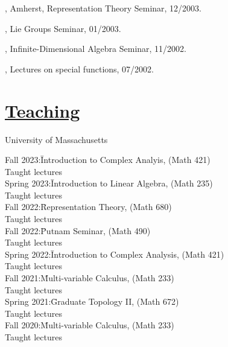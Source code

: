 \documentclass[11pt]{amsart}
\theoremstyle{plain}
\theoremstyle{definition}
\theoremstyle{remark}
\begin{document}
, Amherst,
Representation Theory
          Seminar, 12/2003.

, Lie Groups Seminar, 01/2003.



, Infinite-Dimensional Algebra Seminar,
11/2002.

, Lectures on special
functions, 07/2002.

\medskip


\section*{ {\Large\underline{Teaching}}}
\noindent University of Massachusetts
\begin{tabbing}



  
Fall 2023:\quad\quad\quad\= Introduction to Complex Analyis, (Math 421)\\
\>Taught lectures \\

  
Spring 2023:\quad\quad\= Introduction to Linear Algebra, (Math 235)\\
\>Taught lectures \\


  
Fall 2022:\quad\quad\quad\= Representation Theory, (Math 680)\\
\>Taught lectures \\

  
Fall 2022:\quad\quad\quad\= Putnam Seminar, (Math 490)\\
\>Taught lectures \\


Spring 2022:\quad\quad\= Introduction to Complex Analysis, (Math 421)\\
\>Taught lectures \\


Fall 2021:\quad\quad\quad\= Multi-variable Calculus, (Math 233)\\
\>Taught lectures \\

  
Spring 2021:\quad\quad\= Graduate Topology II, (Math 672)\\
\>Taught lectures \\

  
Fall 2020:\quad\quad\quad\= Multi-variable Calculus, (Math 233)\\
\>Taught lectures \\


\end{tabbing}
\end{document}
